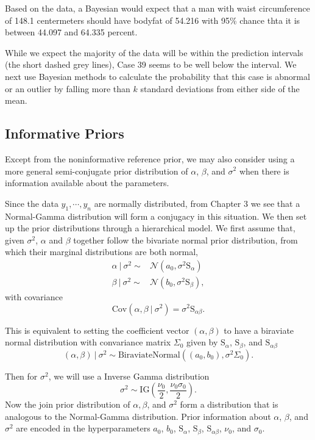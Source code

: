 \documentclass[]{book}
\theoremstyle{definition}
\theoremstyle{definition}
\theoremstyle{definition}
\theoremstyle{remark}
\begin{document}
Based on the data, a Bayesian would expect that a man with waist
circumference of 148.1 centermeters should have bodyfat of 54.216 with
95\% chance thta it is between 44.097 and 64.335 percent.

While we expect the majority of the data will be within the prediction
intervals (the short dashed grey lines), Case 39 seems to be well below
the interval. We next use Bayesian methods to calculate the probability
that this case is abnormal or an outlier by falling more than \(k\)
standard deviations from either side of the mean.

\subsection{Informative Priors}\label{informative-priors}

Except from the noninformative reference prior, we may also consider
using a more general semi-conjugate prior distribution of \(\alpha\),
\(\beta\), and \(\sigma^2\) when there is information available about
the parameters.

Since the data \(y_1,\cdots,y_n\) are normally distributed, from Chapter
3 we see that a Normal-Gamma distribution will form a conjugacy in this
situation. We then set up the prior distributions through a hierarchical
model. We first assume that, given \(\sigma^2\), \(\alpha\) and
\(\beta\) together follow the bivariate normal prior distribution, from
which their marginal distributions are both normal, \[ 
\begin{aligned}
\alpha~|~\sigma^2 \sim & \mathcal{N}(a_0, \sigma^2\text{S}_\alpha) \\
\beta ~|~ \sigma^2 \sim & \mathcal{N}(b_0, \sigma^2\text{S}_\beta),
\end{aligned}
\] with covariance
\[ \text{Cov}(\alpha, \beta ~|~\sigma^2) =\sigma^2 \text{S}_{\alpha\beta}. \]

This is equivalent to setting the coefficient vector \((\alpha, \beta)\)
to have a biraviate normal distribution with convariance matrix
\(\Sigma_0\) given by \(\text{S}_\alpha\), \(\text{S}_{\beta}\), and
\(\text{S}_{\alpha\beta}\)
\[ (\alpha, \beta) ~|~\sigma^2 \sim \text{BiraviateNormal}((a_0, b_0), \sigma^2\Sigma_0). \]

Then for \(\sigma^2\), we will use a Inverse Gamma distribution
\[ \sigma^2 \sim \text{IG}\left(\frac{\nu_0}{2}, \frac{\nu_0\sigma_0}{2}\right). \]
Now the join prior distribution of \(\alpha, \beta\), and \(\sigma^2\)
form a distribution that is analogous to the Normal-Gamma distribution.
Prior information about \(\alpha\), \(\beta\), and \(\sigma^2\) are
encoded in the hyperparameters \(a_0\), \(b_0\), \(\text{S}_\alpha\),
\(\text{S}_\beta\), \(\text{S}_{\alpha\beta}\), \(\nu_0\), and
\(\sigma_0\).
\end{document}
